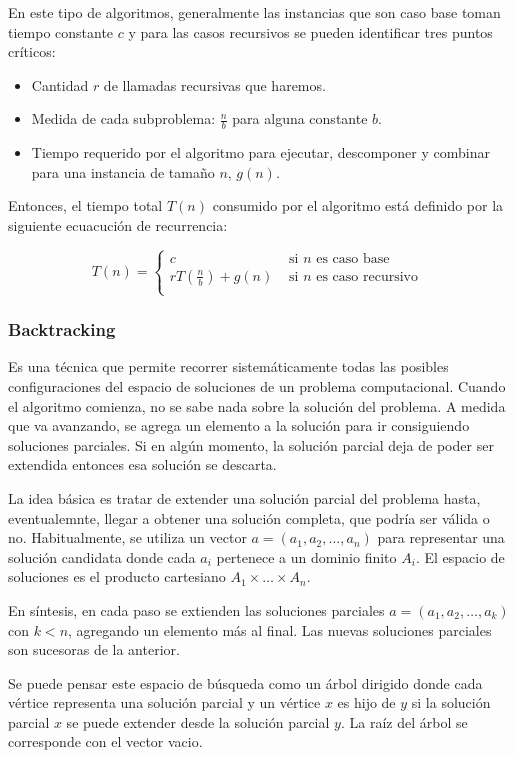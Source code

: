 En este tipo de algoritmos, generalmente las instancias que son caso base toman tiempo constante \(c\) y para las casos recursivos se pueden identificar tres puntos críticos:
\begin{itemize}
	\item Cantidad $r$ de llamadas recursivas que haremos.
	\item Medida de cada subproblema: \(\frac{n}{b}\) para alguna constante \(b\).
	\item Tiempo requerido por el algoritmo para ejecutar, descomponer y combinar para una instancia de tamaño \(n\), \(g(n)\).
\end{itemize}

Entonces, el tiempo total \(T(n)\) consumido por el algoritmo está definido por la siguiente ecuacución de recurrencia:

\[ T(n) = \begin{cases} 
c & \text{ si } n \text{ es caso base }\\
rT\left(\frac{n}{b}\right) + g(n) & \text{ si } n \text{ es caso recursivo } \\
\end{cases}
\]

\subsubsection{Backtracking}
Es una técnica que permite recorrer sistemáticamente todas las posibles configuraciones del espacio de soluciones de un problema computacional. Cuando el algoritmo comienza, no se sabe nada sobre la solución del problema. A medida que va avanzando, se agrega un elemento a la solución para ir consiguiendo soluciones parciales. Si en algún momento, la solución parcial deja de poder ser extendida entonces esa solución se descarta.

La idea básica es tratar de extender una solución parcial del problema hasta, eventualemnte, llegar a obtener una solución completa, que podría ser válida o no. Habitualmente, se utiliza un vector \(a=(a_1,a_2,\dots,a_n)\) para representar una solución candidata donde cada \(a_i\) pertenece a un dominio finito \(A_i\). El espacio de soluciones es el producto cartesiano \(A_1\times\dots\times A_n\).

En síntesis, en cada paso se extienden las soluciones parciales \(a=(a_1,a_2,\dots,a_k)\) con \(k < n\), agregando un elemento más al final. Las nuevas soluciones parciales son sucesoras de la anterior.

Se puede pensar este espacio de búsqueda como un árbol dirigido donde cada vértice representa una solución parcial y un vértice \(x\) es hijo de \(y\) si la solución parcial \(x\) se puede extender desde la solución parcial \(y\). La raíz del árbol se corresponde con el vector vacio.

